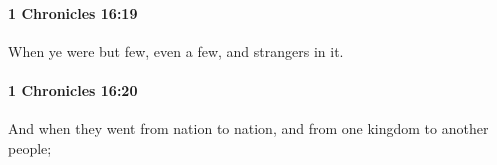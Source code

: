 		\paragraph{1 Chronicles 16:19} %
			\label{1CHRONICLES-16-19}

			When ye were but few, even a few, and strangers in it.


		\paragraph{1 Chronicles 16:20} %
			\label{1CHRONICLES-16-20}

			And when they went from nation to nation, and from one kingdom to another people;


